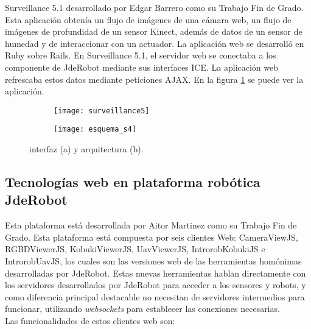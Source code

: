 Surveillance 5.1 desarrollado por Edgar Barrero como su Trabajo Fin de Grado. Esta aplicación obtenía un flujo de imágenes de una cámara web, un flujo de imágenes de profundidad de un sensor Kinect, además de datos de un sensor de humedad y de interaccionar con un actuador. La aplicación web se desarrolló en Ruby sobre Rails. En Surveillance 5.1, el servidor web se conectaba a los componente de JdeRobot mediante sus interfaces ICE. La aplicación web refrescaba estos datos mediante peticiones AJAX.  En la figura \ref{fig:surveillance5} se puede ver la aplicación.\\


\begin{figure}[h]
\centering
  \begin{subfigure}[]{110mm}
    \texttt{[image: surveillance5]}
  \end{subfigure}
  \hspace{5pt}
  \begin{subfigure}[]{110mm}
    \texttt{[image: esquema\_s4]}
  \end{subfigure}
  \caption{interfaz (a) y arquitectura (b).}\label{fig:surveillance5}
\end{figure}


\subsection{Tecnologías web en plataforma robótica JdeRobot}

Esta plataforma está desarrollada por Aitor Martinez como su Trabajo Fin de Grado. Esta plataforma está compuesta por seis clientes Web: CameraViewJS, RGBDViewerJS, KobukiViewerJS, UavViewerJS, IntrorobKobukiJS e IntrorobUavJS, los cuales son las versiones web de las herramientas homónimas desarrolladas por JdeRobot. Estas nuevas herramientas hablan directamente con los servidores desarrollados por JdeRobot para acceder a los sensores y robots, y como diferencia principal destacable no necesitan de servidores intermedios para funcionar, utilizando \emph{websockets} para establecer las conexiones necesarias.\\

\noindent Las funcionalidades de estos clientes web son: 

